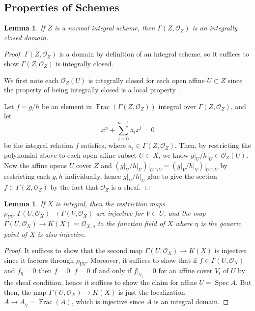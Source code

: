 \documentclass[10pt]{article}
\newtheorem{lemma}[subsubsection]{Lemma}
\theoremstyle{definition}
\theoremstyle{remark}
\numberwithin{equation}{section}
\numberwithin{figure}{subsubsection}
\DeclareMathOperator{\Spec}{Spec}
\DeclareMathOperator{\Frac}{Frac}
\newcommand{\OO}{\mathcal{O}}
\begin{document}
\subsection{Properties of Schemes}
\begin{lemma}\label{lem:normgs}
  If $Z$ is a normal integral scheme, then $\Gamma(Z,\OO_Z)$ is an integrally
  closed domain.
\end{lemma}
\begin{proof}
  $\Gamma(Z,\OO_Z)$ is a domain by definition of an integral scheme, so it
  suffices to show $\Gamma(Z,\OO_Z)$ is integrally closed.
  \par We first note each $\OO_Z(U)$ is integrally closed for each open
  affine $U \subset Z$ since the property of being integrally closed is a local
  property \cite[Prop.~$5.13$]{AM69}.
  \par Let $f = g/h$ be an element in $\Frac(\Gamma(Z,\OO_Z))$ integral over
  $\Gamma(Z,\OO_Z)$, and let
  \begin{equation*}
    x^n + \sum_{i=0}^{n-1} a_ix^i = 0
  \end{equation*}
  be the integral relation $f$ satisfies, where $a_i \in \Gamma(Z,\OO_Z)$. Then,
  by restricting the polynomial above to each open affine subset $U \subset X$,
  we know $g\rvert_U/h\rvert_U \in \OO_Z(U)$. Now the affine opens $U$ cover
  $Z$ and $(g\rvert_U/h\rvert_U)\rvert_{U \cap V} =
  (g\rvert_V/h\rvert_V)\rvert_{U \cap V}$ by restricting each $g,h$
  individually, hence $g\rvert_U/h\rvert_U$ glue to give the section $f \in
  \Gamma(Z,\OO_Z)$ by the fact that $\OO_Z$ is a sheaf.
\end{proof}
\begin{lemma}\label{lem:integralrest}
  If $X$ is integral, then the restriction maps $\rho_{UV}\colon \Gamma(U,\OO_X) \to
  \Gamma(V,\OO_X)$ are injective for $V \subset U$, and the map $\Gamma(U,\OO_X)
  \to K(X) \eqqcolon \OO_{X,\eta}$ to the function field of $X$ where $\eta$ is
  the generic point of $X$ is also injective.
\end{lemma}
\begin{proof}
  It suffices to show that the second map $\Gamma(U,\OO_X) \to K(X)$ is
  injective since it factors through $\rho_{UV}$. Moreover, it suffices to show
  that if $f \in \Gamma(U,\OO_X)$ and $f_\eta = 0$ then $f = 0$. $f = 0$ if and
  only if $f\rvert_{V_i} = 0$ for an affine cover $V_i$ of $U$ by the sheaf
  condition, hence it suffices to show the claim for affine $U = \Spec A$. But
  then, the map $\Gamma(U,\OO_X) \to K(X)$ is just the localization $A \to
  A_\eta = \Frac(A)$, which is injective since $A$ is an integral domain.
\end{proof}
\end{document}
